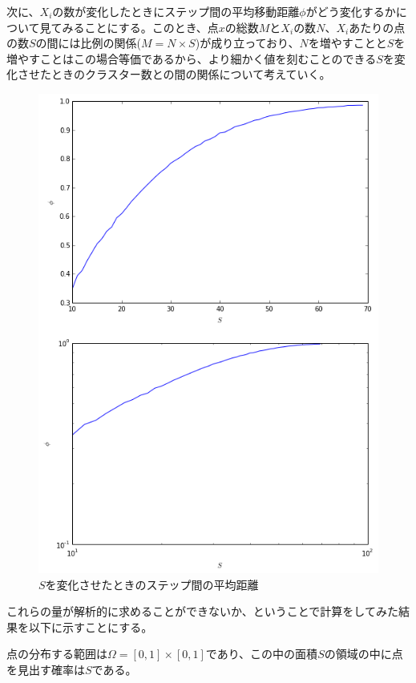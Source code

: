 次に、$X_{i}$の数が変化したときにステップ間の平均移動距離$\phi$がどう変化するかについて見てみることにする。このとき、点$x$の総数$M$と$X_{i}$の数$N$、$X_{i}$あたりの点の数$S$の間には比例の関係($M=N\times S$)が成り立っており、$N$を増やすことと$S$を増やすことはこの場合等価であるから、より細かく値を刻むことのできる$S$を変化させたときのクラスター数との間の関係について考えていく。
\begin{figure}[H]
    \begin{center}
        \includegraphics[width=12.5cm]{../img/S_phi_1.png}
        \caption{$S$を変化させたときのステップ間の平均距離}
        \label{fig:f19}
    \end{center}
\end{figure}

これらの量が解析的に求めることができないか、ということで計算をしてみた結果を以下に示すことにする。

点の分布する範囲は$\Omega = [0,1]\times [0,1]$であり、この中の面積$S$の領域の中に点を見出す確率は$S$である。

